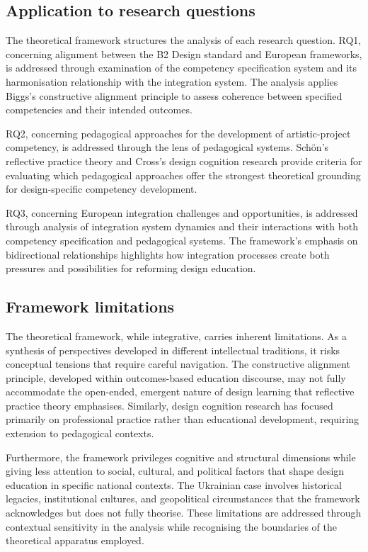 \documentclass[ed]{acnsart}
\begin{document}
	\subsection{Application to research questions}
	
	The theoretical framework structures the analysis of each research question. RQ1, concerning alignment between the B2 Design standard and European frameworks, is addressed through examination of the competency specification system and its harmonisation relationship with the integration system. The analysis applies Biggs's constructive alignment principle to assess coherence between specified competencies and their intended outcomes.
	
	RQ2, concerning pedagogical approaches for the development of artistic-project competency, is addressed through the lens of pedagogical systems. Schön's reflective practice theory and Cross's design cognition research provide criteria for evaluating which pedagogical approaches offer the strongest theoretical grounding for design-specific competency development.
	
	RQ3, concerning European integration challenges and opportunities, is addressed through analysis of integration system dynamics and their interactions with both competency specification and pedagogical systems. The framework's emphasis on bidirectional relationships highlights how integration processes create both pressures and possibilities for reforming design education.
	
	\subsection{Framework limitations}
	
	The theoretical framework, while integrative, carries inherent limitations. As a synthesis of perspectives developed in different intellectual traditions, it risks conceptual tensions that require careful navigation. The constructive alignment principle, developed within outcomes-based education discourse, may not fully accommodate the open-ended, emergent nature of design learning that reflective practice theory emphasises. Similarly, design cognition research has focused primarily on professional practice rather than educational development, requiring extension to pedagogical contexts.
	
	Furthermore, the framework privileges cognitive and structural dimensions while giving less attention to social, cultural, and political factors that shape design education in specific national contexts. The Ukrainian case involves historical legacies, institutional cultures, and geopolitical circumstances that the framework acknowledges but does not fully theorise. These limitations are addressed through contextual sensitivity in the analysis while recognising the boundaries of the theoretical apparatus employed.
	
\end{document}
